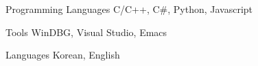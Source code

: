 

\begin{cvskills}

  \cvskill
    {Programming Languages} %
    {C/C++, C\#, Python, Javascript} %

  \cvskill
    {Tools} %
    {WinDBG, Visual Studio, Emacs} %

  \cvskill
    {Languages} %
    {Korean, English} %

\end{cvskills}
